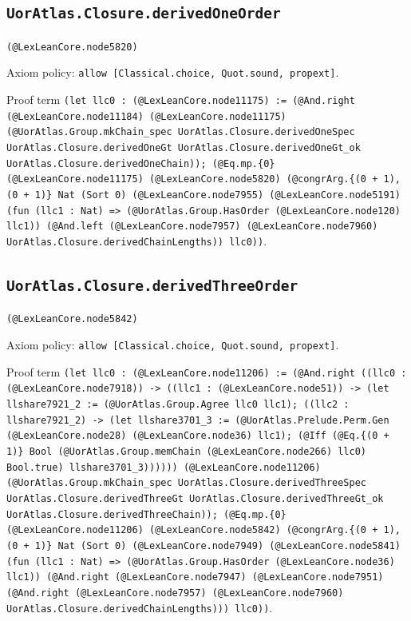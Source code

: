 \documentclass[11pt]{article}
\begin{document}
\subsection*{\texttt{UorAtlas.Closure.derivedOneOrder}}
\noindent\texttt{(@LexLeanCore.node5820)}\par
\noindent Axiom policy: \texttt{allow [Classical.choice, Quot.sound, propext]}.\par
\noindent Proof term \texttt{(let llc0 : (@LexLeanCore.node11175) := (@And.right (@LexLeanCore.node11184) (@LexLeanCore.node11175) (@UorAtlas.Group.mkChain\_spec UorAtlas.Closure.derivedOneSpec UorAtlas.Closure.derivedOneGt UorAtlas.Closure.derivedOneGt\_ok UorAtlas.Closure.derivedOneChain)); (@Eq.mp.\{0\} (@LexLeanCore.node11175) (@LexLeanCore.node5820) (@congrArg.\{(0 + 1), (0 + 1)\} Nat (Sort 0) (@LexLeanCore.node7955) (@LexLeanCore.node5191) (fun (llc1 : Nat) => (@UorAtlas.Group.HasOrder (@LexLeanCore.node120) llc1)) (@And.left (@LexLeanCore.node7957) (@LexLeanCore.node7960) UorAtlas.Closure.derivedChainLengths)) llc0))}.\par
\subsection*{\texttt{UorAtlas.Closure.derivedThreeOrder}}
\noindent\texttt{(@LexLeanCore.node5842)}\par
\noindent Axiom policy: \texttt{allow [Classical.choice, Quot.sound, propext]}.\par
\noindent Proof term \texttt{(let llc0 : (@LexLeanCore.node11206) := (@And.right ((llc0 : (@LexLeanCore.node7918)) -> ((llc1 : (@LexLeanCore.node51)) -> (let llshare7921\_2 := (@UorAtlas.Group.Agree llc0 llc1); ((llc2 : llshare7921\_2) -> (let llshare3701\_3 := (@UorAtlas.Prelude.Perm.Gen (@LexLeanCore.node28) (@LexLeanCore.node36) llc1); (@Iff (@Eq.\{(0 + 1)\} Bool (@UorAtlas.Group.memChain (@LexLeanCore.node266) llc0) Bool.true) llshare3701\_3)))))) (@LexLeanCore.node11206) (@UorAtlas.Group.mkChain\_spec UorAtlas.Closure.derivedThreeSpec UorAtlas.Closure.derivedThreeGt UorAtlas.Closure.derivedThreeGt\_ok UorAtlas.Closure.derivedThreeChain)); (@Eq.mp.\{0\} (@LexLeanCore.node11206) (@LexLeanCore.node5842) (@congrArg.\{(0 + 1), (0 + 1)\} Nat (Sort 0) (@LexLeanCore.node7949) (@LexLeanCore.node5841) (fun (llc1 : Nat) => (@UorAtlas.Group.HasOrder (@LexLeanCore.node36) llc1)) (@And.right (@LexLeanCore.node7947) (@LexLeanCore.node7951) (@And.right (@LexLeanCore.node7957) (@LexLeanCore.node7960) UorAtlas.Closure.derivedChainLengths))) llc0))}.\par
\end{document}
